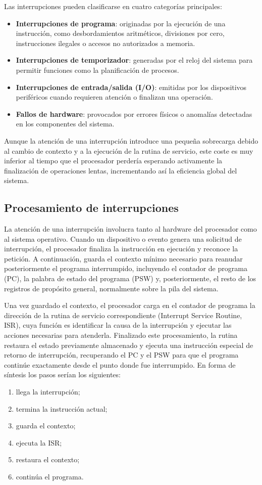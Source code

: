 Las interrupciones pueden clasificarse en cuatro categorías principales:
\begin{itemize}
  \item \textbf{Interrupciones de programa}: originadas por la ejecución de una instrucción, como desbordamientos aritméticos, divisiones por cero, instrucciones ilegales o accesos no autorizados a memoria.
  \item \textbf{Interrupciones de temporizador}: generadas por el reloj del sistema para permitir funciones como la planificación de procesos.
  \item \textbf{Interrupciones de entrada/salida (I/O)}: emitidas por los dispositivos periféricos cuando requieren atención o finalizan una operación.
  \item \textbf{Fallos de hardware}: provocados por errores físicos o anomalías detectadas en los componentes del sistema.
\end{itemize}

Aunque la atención de una interrupción introduce una pequeña sobrecarga debido al cambio de contexto y a la ejecución de la rutina de servicio, este coste es muy inferior al tiempo que el procesador perdería esperando activamente la finalización de operaciones lentas, incrementando así la eficiencia global del sistema.

\subsection{Procesamiento de interrupciones}

La atención de una interrupción involucra tanto al hardware del procesador como al sistema operativo. Cuando un dispositivo o evento genera una solicitud de interrupción, el procesador finaliza la instrucción en ejecución y reconoce la petición. A continuación, guarda el contexto mínimo necesario para reanudar posteriormente el programa interrumpido, incluyendo el contador de programa (PC), la palabra de estado del programa (PSW) y, posteriormente, el resto de los registros de propósito general, normalmente sobre la pila del sistema.

Una vez guardado el contexto, el procesador carga en el contador de programa la dirección de la rutina de servicio correspondiente (Interrupt Service Routine, ISR), cuya función es identificar la causa de la interrupción y ejecutar las acciones necesarias para atenderla. Finalizado este procesamiento, la rutina restaura el estado previamente almacenado y ejecuta una instrucción especial de retorno de interrupción, recuperando el PC y el PSW para que el programa continúe exactamente desde el punto donde fue interrumpido. En forma de síntesis los pasos serían los siguientes:
\begin{enumerate}
  \item llega la interrupción;
  \item termina la instrucción actual;
  \item guarda el contexto;
  \item ejecuta la ISR;
  \item restaura el contexto;
  \item continúa el programa.
\end{enumerate}

